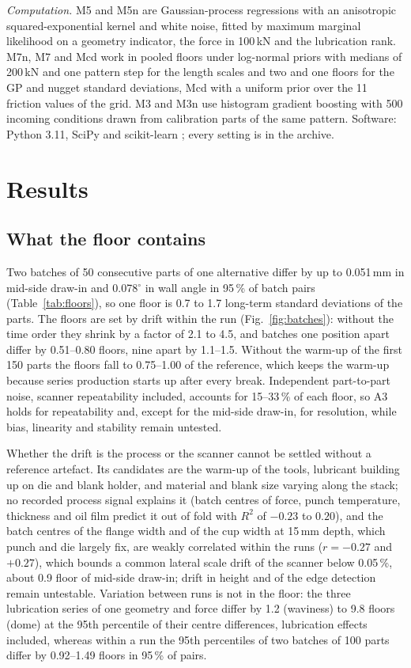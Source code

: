 \documentclass[pdflatex,sn-basic,lineno]{sn-jnl}
\begin{document}
\emph{Computation.} M5 and M5n are Gaussian-process regressions with an anisotropic squared-exponential kernel and white noise, fitted by maximum marginal likelihood on a geometry indicator, the force in 100\,kN and the lubrication rank. M7n, M7 and Mcd work in pooled floors under log-normal priors with medians of 200\,kN and one pattern step for the length scales and two and one floors for the GP and nugget standard deviations, Mcd with a uniform prior over the 11 friction values of the grid. M3 and M3n use histogram gradient boosting with 500 incoming conditions drawn from calibration parts of the same pattern. Software: Python 3.11, SciPy and scikit-learn \citep{pedregosa2011scikit}; every setting is in the archive.

\section{Results}\label{sec:results}

\subsection{What the floor contains}\label{sec:res-floor}

Two batches of 50 consecutive parts of one alternative differ by up to 0.051\,mm in mid-side draw-in and 0.078$^\circ$ in wall angle in 95\,\% of batch pairs (Table~\ref{tab:floors}), so one floor is 0.7 to 1.7 long-term standard deviations of the parts. The floors are set by drift within the run (Fig.~\ref{fig:batches}): without the time order they shrink by a factor of 2.1 to 4.5, and batches one position apart differ by 0.51--0.80 floors, nine apart by 1.1--1.5. Without the warm-up of the first 150 parts the floors fall to 0.75--1.00 of the reference, which keeps the warm-up because series production starts up after every break. Independent part-to-part noise, scanner repeatability included, accounts for 15--33\,\% of each floor, so A3 holds for repeatability and, except for the mid-side draw-in, for resolution, while bias, linearity and stability remain untested.

Whether the drift is the process or the scanner cannot be settled without a reference artefact. Its candidates are the warm-up of the tools, lubricant building up on die and blank holder, and material and blank size varying along the stack; no recorded process signal explains it (batch centres of force, punch temperature, thickness and oil film predict it out of fold with $R^2$ of $-0.23$ to $0.20$), and the batch centres of the flange width and of the cup width at 15\,mm depth, which punch and die largely fix, are weakly correlated within the runs ($r=-0.27$ and $+0.27$), which bounds a common lateral scale drift of the scanner below 0.05\,\%, about 0.9 floor of mid-side draw-in; drift in height and of the edge detection remain untestable. Variation between runs is not in the floor: the three lubrication series of one geometry and force differ by 1.2 (waviness) to 9.8 floors (dome) at the 95th percentile of their centre differences, lubrication effects included, whereas within a run the 95th percentiles of two batches of 100 parts differ by 0.92--1.49 floors in 95\,\% of pairs.
\end{document}
